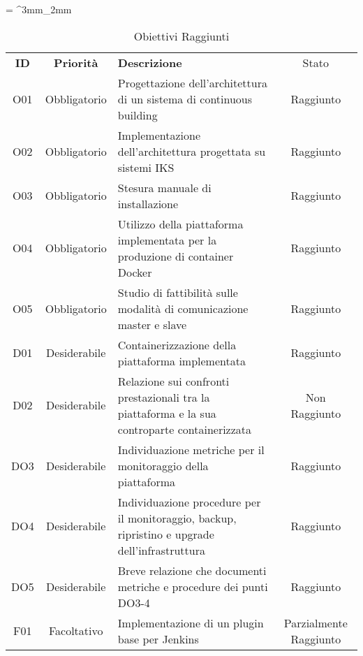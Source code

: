 \newpage
{}
\tabulinesep = ^3mm_2mm
\begin{longtabu} to \textwidth {ccXc}
    \caption[Obiettivi Raggiunti]{Obiettivi Raggiunti}
    \label{tab:obiettivi-finali}
    \endlastfoot
    \rowfont{\bfseries\sffamily\leavevmode\color{white}}
    \textbf{ID} & \textbf{Priorità} & \textbf{Descrizione} & Stato \\
    O01 & Obbligatorio & Progettazione dell’architettura di un sistema di \gls{continuous building} & Raggiunto \\ %
    O02 & Obbligatorio & Implementazione dell’architettura progettata su sistemi IKS & Raggiunto \\ %
    O03 & Obbligatorio & Stesura manuale di installazione & Raggiunto \\ %
    O04 & Obbligatorio & Utilizzo della piattaforma implementata per la produzione di \gls{container} Docker & Raggiunto \\ %
    O05 & Obbligatorio & Studio di fattibilità sulle modalità di comunicazione master e slave & Raggiunto \\ %
    D01 & Desiderabile & Containerizzazione della piattaforma implementata & Raggiunto\\ %
    D02 & Desiderabile & Relazione sui confronti prestazionali tra la piattaforma e la sua controparte containerizzata & Non Raggiunto\\ %
    DO3 & Desiderabile & Individuazione metriche per il monitoraggio della piattaforma & Raggiunto \\ %
    DO4 & Desiderabile &  Individuazione procedure per il monitoraggio, backup, ripristino e upgrade dell’infrastruttura & Raggiunto\\ %
    DO5 & Desiderabile & Breve relazione che documenti metriche e procedure dei punti DO3-4 & Raggiunto\\ %
    F01 & Facoltativo & Implementazione di un plugin base per Jenkins & Parzialmente Raggiunto\\ %
\end{longtabu}